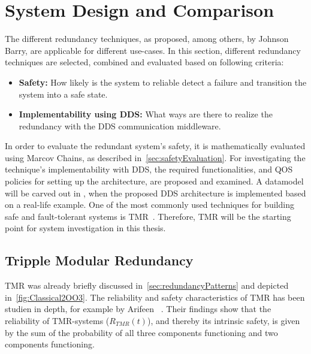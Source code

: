 
\section{System Design and Comparison}
The different redundancy techniques, as proposed, among others, by Johnson Barry, are applicable for different use-cases.
In this section, different redundancy techniques are selected, combined and evaluated based on following criteria:

\begin{itemize}
\item \textbf{Safety:} How likely is the system to reliable detect a failure and transition the system into a safe state.
\item \textbf{Implementability using \gls*{DDS}:} What ways are there to realize the redundancy with the \gls*{DDS} communication middleware.
\end{itemize}

In order to evaluate the redundant system's safety, it is mathematically evaluated using Marcov Chains, as described in~\autoref{sec:safetyEvaluation}.
For investigating the technique's implementability with \gls*{DDS}, the required functionalities, and \gls*{QOS} policies for setting up the architecture, are proposed and examined.
A datamodel will be carved out in , when the proposed \gls*{DDS} architecture is implemented based on a real-life example.
One of the most commonly used techniques for building safe and fault-tolerant systems is \gls*{TMR}~\cite{FaultToleranceViaNMR}.
Therefore, \gls*{TMR} will be the starting point for system investigation in this thesis.

\subsection{Tripple Modular Redundancy}
\Gls*{TMR} was already briefly discussed in~\autoref{sec:redundancyPatterns} and depicted in~\autoref{fig:Classical2OO3}.
The reliability and safety characteristics of \gls*{TMR} has been studien in depth, for example by Arifeen \etal~\cite{ArifeenFaultTolerantTMR}.
Their findings show that the reliability of \gls*{TMR}-systems ($R_{TMR}(t)$), and thereby its intrinsic safety, is given by the sum of the probability of all three components functioning and two components functioning.

